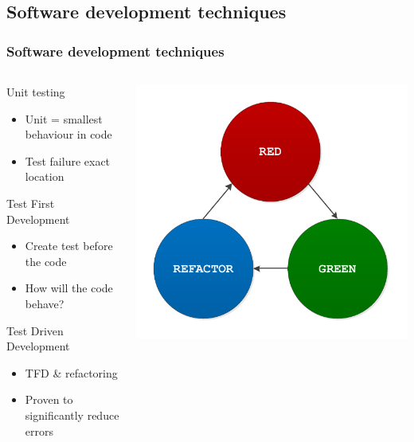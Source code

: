 \documentclass[british,10pt]{beamer}
\begin{document}
\subsection{Software development techniques}
\begin{frame}\frametitle{Software development techniques}
\begin{columns}
\begin{column}{0.6\textwidth}
Unit testing
\begin{itemize}
\item Unit = smallest behaviour in code
\item Test failure  exact location
\end{itemize}
\vskip3pt
Test First Development
\begin{itemize}
\item Create test before the code
\item How will the code behave?
\end{itemize}
\vskip3pt
Test Driven Development
\begin{itemize}
\item TFD \& refactoring
\item Proven to significantly reduce errors
\end{itemize}
\end{column}
\includegraphics[width=\textwidth]{images/tdd.pdf}
\end{columns}
\end{frame}
\end{document}
